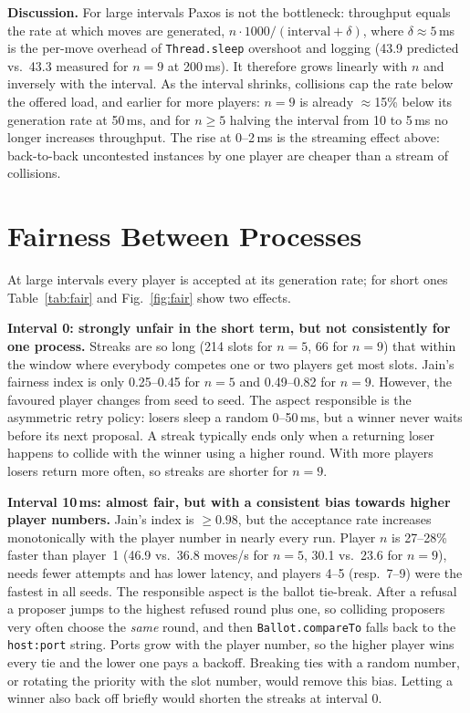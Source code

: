 \documentclass[11pt]{article}
\begin{document}
\textbf{Discussion.} For large intervals Paxos is not the bottleneck: throughput equals the rate at which moves are generated, $n\cdot1000/(\text{interval}+\delta)$, where $\delta\approx5$\,ms is the per-move overhead of \texttt{Thread.sleep} overshoot and logging (43.9 predicted vs.\ 43.3 measured for $n=9$ at 200\,ms). It therefore grows linearly with $n$ and inversely with the interval. As the interval shrinks, collisions cap the rate below the offered load, and earlier for more players: $n=9$ is already $\approx$15\% below its generation rate at 50\,ms, and for $n\ge5$ halving the interval from 10 to 5\,ms no longer increases throughput. The rise at 0--2\,ms is the streaming effect above: back-to-back uncontested instances by one player are cheaper than a stream of collisions.

\section{Fairness Between Processes}
At large intervals every player is accepted at its generation rate; for short ones Table~\ref{tab:fair} and Fig.~\ref{fig:fair} show two effects.

\textbf{Interval 0: strongly unfair in the short term, but not consistently for one process.} Streaks are so long (214 slots for $n=5$, 66 for $n=9$) that within the window where everybody competes one or two players get most slots. Jain's fairness index is only 0.25--0.45 for $n=5$ and 0.49--0.82 for $n=9$. However, the favoured player changes from seed to seed. The aspect responsible is the asymmetric retry policy: losers sleep a random 0--50\,ms, but a winner never waits before its next proposal. A streak typically ends only when a returning loser happens to collide with the winner using a higher round. With more players losers return more often, so streaks are shorter for $n=9$.

\textbf{Interval 10\,ms: almost fair, but with a consistent bias towards higher player numbers.} Jain's index is $\ge0.98$, but the acceptance rate increases monotonically with the player number in nearly every run. Player $n$ is 27--28\% faster than player~1 (46.9 vs.\ 36.8 moves/s for $n=5$, 30.1 vs.\ 23.6 for $n=9$), needs fewer attempts and has lower latency, and players 4--5 (resp.\ 7--9) were the fastest in all seeds. The responsible aspect is the ballot tie-break. After a refusal a proposer jumps to the highest refused round plus one, so colliding proposers very often choose the \emph{same} round, and then \texttt{Ballot.compareTo} falls back to the \texttt{host:port} string. Ports grow with the player number, so the higher player wins every tie and the lower one pays a backoff. Breaking ties with a random number, or rotating the priority with the slot number, would remove this bias. Letting a winner also back off briefly would shorten the streaks at interval 0.
\end{document}
